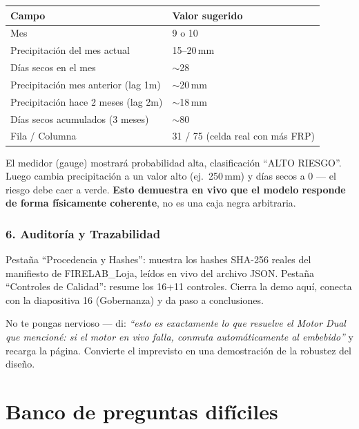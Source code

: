 \documentclass[11pt,a4paper]{article}
\begin{document}
\begin{table}[H]
\centering
\small
\begin{tabular}{@{}ll@{}}
\toprule
\textbf{Campo} & \textbf{Valor sugerido} \\
\midrule
Mes & 9 o 10 \\
Precipitaci\'on del mes actual & 15--20\,mm \\
D\'ias secos en el mes & $\sim$28 \\
Precipitaci\'on mes anterior (lag 1m) & $\sim$20\,mm \\
Precipitaci\'on hace 2 meses (lag 2m) & $\sim$18\,mm \\
D\'ias secos acumulados (3 meses) & $\sim$80 \\
Fila / Columna & 31 / 75 (celda real con m\'as FRP) \\
\bottomrule
\end{tabular}
\end{table}

El medidor (gauge) mostrar\'a probabilidad alta, clasificaci\'on ``ALTO RIESGO''. Luego cambia precipitaci\'on a un valor alto (ej.\ 250\,mm) y d\'ias secos a 0 --- el riesgo debe caer a verde. \textbf{Esto demuestra en vivo que el modelo responde de forma f\'isicamente coherente}, no es una caja negra arbitraria.

\subsubsection*{6. Auditor\'ia y Trazabilidad}
Pesta\~na ``Procedencia y Hashes'': muestra los hashes SHA-256 reales del manifiesto de FIRELAB\_Loja, le\'idos en vivo del archivo JSON. Pesta\~na ``Controles de Calidad'': resume los 16+11 controles. Cierra la demo aqu\'i, conecta con la diapositiva 16 (Gobernanza) y da paso a conclusiones.

\begin{alertabox}[title={Si algo falla en vivo}]
No te pongas nervioso --- di: \emph{``esto es exactamente lo que resuelve el Motor Dual que mencion\'e: si el motor en vivo falla, conmuta autom\'aticamente al embebido''} y recarga la p\'agina. Convierte el imprevisto en una demostraci\'on de la robustez del dise\~no.
\end{alertabox}

\newpage
\section{Banco de preguntas dif\'iciles}
\end{document}
